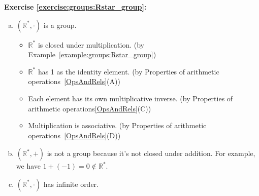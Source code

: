 \noindent\textbf{Exercise \ref{exercise:groups:Rstar_group}:}
\begin{enumerate}[(a)]
\item
$({\mathbb R}^{\ast}, \cdot)$ is a group.
\begin{itemize}
	\item
	${\mathbb R}^{\ast}$ is closed under multiplication. (by Example~\ref{example:groups:Rstar_group}) 

	\item
	${\mathbb R}^{\ast}$ has 1 as the identity element. (by Properties of arithmetic operations~\ref{OpsAndRels}(A))

	\item
	Each element has its own multiplicative inverse. (by  Properties of arithmetic operations\ref{OpsAndRels}(C))

	\item
	Multiplication is associative. (by Properties of arithmetic operations~\ref{OpsAndRels}(D))
	\end{itemize}
	
\item
$({\mathbb R}^{\ast}, +)$ is not a group because it's not closed under addition. For example, we have $1 + (-1) = 0 \not\in {\mathbb R}^{\ast}$.

\item
$({\mathbb R}^{\ast}, \cdot)$ has infinite order.
\end{enumerate}

